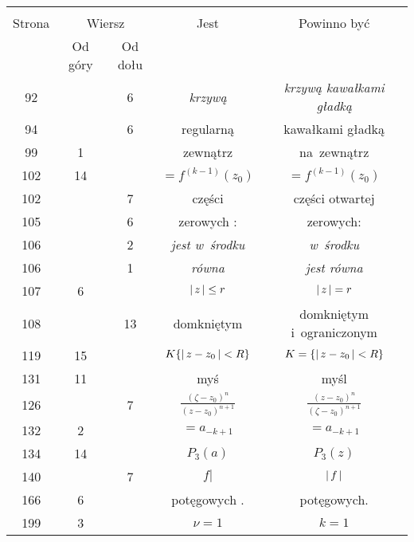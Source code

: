 \documentclass[a4paper,11pt]{article}
\begin{document}
\begin{center}
  \begin{tabular}{|c|c|c|c|c|}
    \hline
    & \multicolumn{2}{c|}{} & & \\
    Strona & \multicolumn{2}{c|}{Wiersz} & Jest
                              & Powinno być \\ \cline{2-3}
    & Od góry & Od dołu & & \\
    \hline
    92  & &  6 & \emph{krzywą} & \emph{krzywą kawałkami gładką} \\
    94  & &  6 & regularną & kawałkami gładką \\
    99  &  1 & & zewnątrz & na~zewnątrz \\
    102 & 14 & & $=\!\! f^{ ( k - 1 ) }( z_{ 0 } )$
           & $= f^{ ( k - 1 ) }( z_{ 0 } )$ \\
    102 & &  7 & części & części otwartej \\
    105 & &  6 & zerowych : & zerowych: \\
    106 & &  2 & \emph{jest w~środku} & \emph{w~środku} \\
    106 & &  1 & \emph{równa} & \emph{jest równa} \\
    107 &  6 & & $\left| \,  z  \, \right| \leq r$ & $\left| \,  z  \, \right| = r$ \\
    108 & & 13 & domkniętym & domkniętym i~ograniczonym \\
    119 & 15 & & $K \{ \left| \,  z - z_{ 0 }  \, \right| < R \}$
           & $K = \{ \left| \,  z - z_{ 0 }  \, \right| < R \}$ \\
    131 & 11 & & myś & myśl \\
    126 & &  7 & $\frac{ ( \zeta - z_{ 0 } )^{ n } }{
                 ( z - z_{ 0 } )^{ n + 1 } }$
           & $\frac{ ( z - z_{ 0 } )^{ n } }{
             ( \zeta - z_{ 0 } )^{ n + 1 } }$ \\
    132 &  2 & & $=\!\! a_{ -k + 1 }$ & $= a_{ -k + 1 }$ \\
    134 & 14 & & $P_{ 3 }( a )$ & $P_{ 3 }( z )$ \\
    140 & &  7 & $f |$ & $\left| \,  f  \, \right|$ \\
    166 &  6 & & potęgowych . & potęgowych. \\
    199 &  3 & & $\nu = 1 $ & $k = 1$ \\
    \hline
  \end{tabular}
\end{center}
\end{document}
